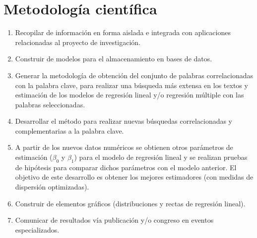 \section {Metodología científica}
\begin{enumerate}
\item Recopilar de información en forma aislada e integrada con aplicaciones relacionadas al proyecto de investigación.
\item Construir de modelos para el almacenamiento en bases de datos.
\item Generar la metodología de obtención del conjunto de palabras correlacionadas con la palabra clave, para realizar una búsqueda más extensa en los textos y estimación de los modelos de regresión lineal y/o regresión múltiple con las palabras seleccionadas.
\item Desarrollar el método para realizar nuevas búsquedas correlacionadas y complementarias a la palabra clave.
\item A partir de los nuevos datos numéricos se obtienen otros parámetros de estimación ($\beta_0$ y $\beta_1$) para el modelo de regresión lineal y se realizan pruebas de hipótesis para comparar dichos parámetros con el modelo anterior. El objetivo de este desarrollo es obtener los mejores estimadores (con medidas de dispersión optimizadas).
\item Construir de elementos gráficos (distribuciones y rectas de regresión lineal).
\item Comunicar de resultados vía publicación y/o congreso en eventos especializados.
\end{enumerate}